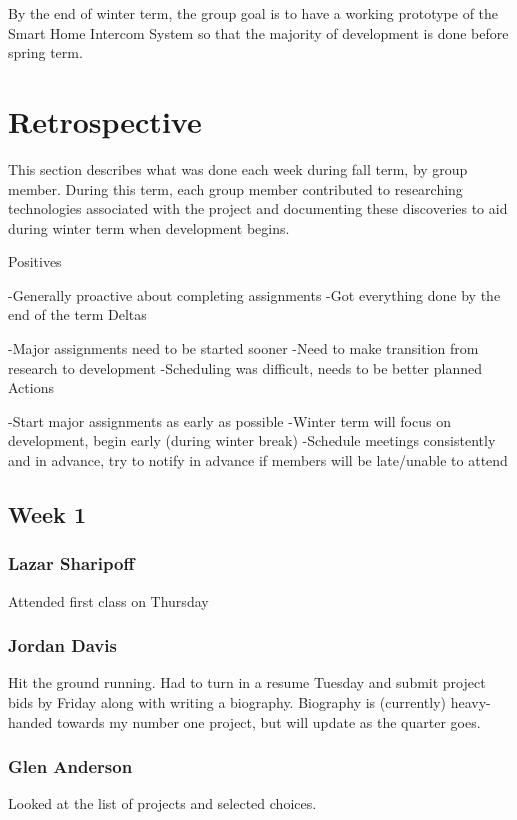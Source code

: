 \documentclass[onecolumn, draftclsnofoot,10pt, compsoc]{IEEEtran}
\begin{document}
By the end of winter term, the group goal is to have a working prototype of the Smart Home Intercom System so that the majority of development is done before spring term. 

\section{Retrospective}
This section describes what was done each week during fall term, by group member. During this term, each group member contributed to researching technologies associated with the project and documenting these discoveries to aid during winter term when development begins. 

Positives

-Generally proactive about completing assignments
-Got everything done by the end of the term 
Deltas

-Major assignments need to be started sooner
-Need to make transition from research to development
-Scheduling was difficult, needs to be better planned
Actions

-Start major assignments as early as possible
-Winter term will focus on development, begin early (during winter break)
-Schedule meetings consistently and in advance, try to notify in advance if members will be late/unable to attend


\subsection{Week 1}
\subsubsection{Lazar Sharipoff}
Attended first class on Thursday


\subsubsection{Jordan Davis}
Hit the ground running. Had to turn in a resume Tuesday and submit project bids by Friday along with writing a biography. Biography is (currently) heavy-handed towards my number one project, but will update as the quarter goes.

\subsubsection{Glen Anderson}
Looked at the list of projects and selected choices. 
\end{document}
